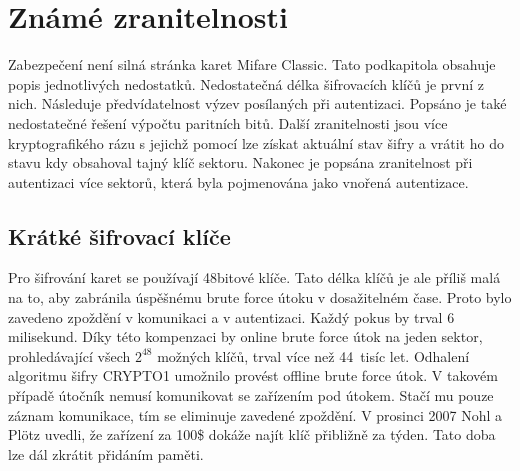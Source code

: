 \chapter{Známé zranitelnosti}
\label{zranitelnosti}
Zabezpečení není silná stránka karet Mifare Classic. Tato podkapitola obsahuje popis jednotlivých nedostatků. Nedostatečná délka šifrovacích klíčů je první z nich. Následuje předvídatelnost výzev posílaných při autentizaci. Popsáno je také nedostatečné řešení výpočtu paritních bitů. Další zranitelnosti jsou více kryptografikého rázu s jejichž pomocí lze získat aktuální stav šifry a vrátit ho do stavu kdy obsahoval tajný klíč sektoru. Nakonec je popsána zranitelnost při autentizaci více sektorů, která byla pojmenována jako vnořená autentizace.
\par
\section{Krátké šifrovací klíče}
Pro šifrování karet se používají 48bitové klíče. Tato délka klíčů je ale příliš malá na to, aby zabránila úspěšnému brute force útoku v dosažitelném čase. Proto bylo zavedeno zpoždění v komunikaci a v autentizaci. Každý pokus by trval 6 milisekund. Díky této kompenzaci by online brute force útok na jeden sektor, prohledávající všech $2^{48}$ možných klíčů, trval více než 44~tisíc let. Odhalení algoritmu šifry CRYPTO1 umožnilo provést offline brute force útok. V takovém případě útočník nemusí komunikovat se zařízením pod útokem. Stačí mu pouze záznam komunikace, tím se eliminuje zavedené zpoždění. V prosinci 2007 Nohl a Plötz uvedli, že zařízení za 100\$ dokáže najít klíč přibližně za týden. Tato doba lze dál zkrátit přidáním paměti\cite{Cryptanalisis}.
\par

